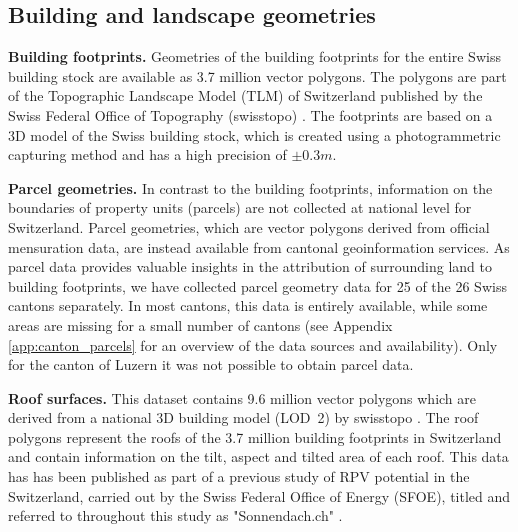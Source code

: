 \subsection{Building and landscape geometries}
\label{data_geometry}

\textbf{Building footprints.} 
Geometries of the building footprints for the entire Swiss building stock are available as 3.7 million vector polygons. 
The polygons are part of the Topographic Landscape Model (TLM) of Switzerland published by the Swiss Federal Office of Topography (swisstopo) \cite{swisstopo_swisstlm3d_2018}. 
The footprints are based on a 3D model of the Swiss building stock, which is created using a photogrammetric capturing method and has a high precision of $\pm 0.3 m$.

\textbf{Parcel geometries.}
In contrast to the building footprints, information on the boundaries of property units (parcels) are not collected at national level for Switzerland. 
Parcel geometries, which are vector polygons derived from official mensuration data, are instead available from cantonal geoinformation services. 
As parcel data provides valuable insights in the attribution of surrounding land to building footprints, we have collected parcel geometry data for 25 of the 26 Swiss cantons separately.
In most cantons, this data is entirely available, while some areas are missing for a small number of cantons (see Appendix \ref{app:canton_parcels} for an overview of the data sources and availability). Only for the canton of Luzern it was not possible to obtain parcel data.

\textbf{Roof surfaces.}
This dataset contains 9.6 million vector polygons which are derived from a national 3D building model (LOD~2) by swisstopo \cite{klauser_solarpotentialanalyse_2016}.
The roof polygons represent the roofs of the 3.7 million building footprints in Switzerland and contain information  on the tilt, aspect and tilted area of each roof.
This data has has been published as part of a previous study of RPV potential in the Switzerland, carried out by the Swiss Federal Office of Energy (SFOE), titled and referred to throughout this study as "Sonnendach.ch" \cite{klauser_solarpotentialanalyse_2016}.

